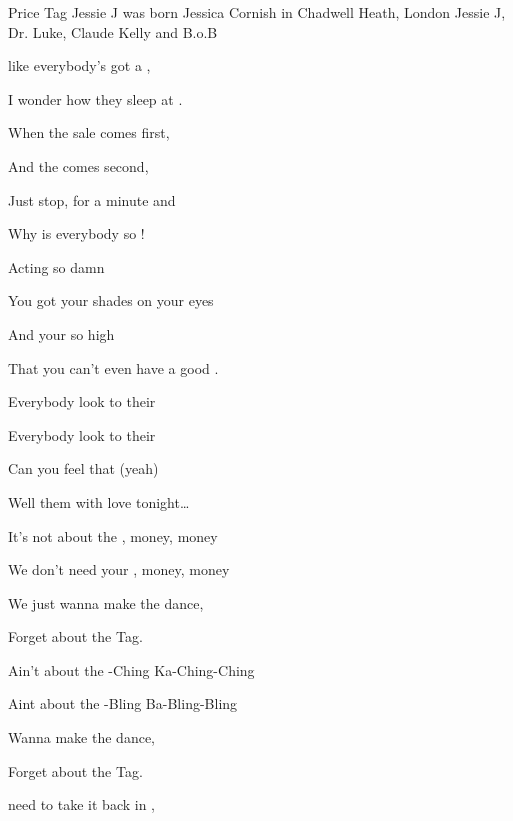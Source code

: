 \begin{SBSong}{Price Tag}
  {Jessie J was born Jessica Cornish in Chadwell Heath, London}
  {Jessie J, Dr. Luke, Claude Kelly and B.o.B}
  \begin{SBVerse}
     like everybody's got a ,
    
    I wonder how they sleep at .
    
    When the sale comes first,
    
    And the  comes second,
    
    Just stop, for a minute and 

    Why is everybody so !
    
    Acting so damn 
    
    You got your shades on your eyes
    
    And your  so high
    
    That you can't even have a good .
  \end{SBVerse}
  \begin{SBChorus}
    Everybody look to their  
    
    Everybody look to their  
    
    Can you feel that (yeah)
    
    Well  them with love tonight\ldots

    It's not about the , money, money
    
    We don't need your , money, money
    
    We just wanna make the  dance,
    
    Forget about the  Tag.

    Ain't about the -Ching Ka-Ching-Ching
    
    Aint about the -Bling Ba-Bling-Bling
    
    Wanna make the  dance,
    
    Forget about the  Tag.
  \end{SBChorus}
  \CBPageBrk
  \begin{SBVerse}
     need to take it back in ,
    

\end{SBVerse}
\end{SBSong}
